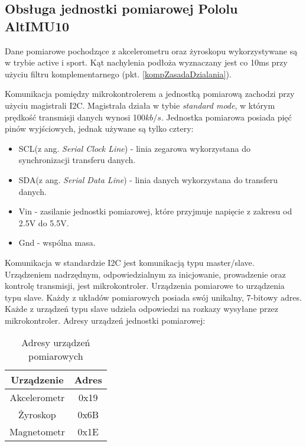 \subsection{Obsługa jednostki pomiarowej Pololu AltIMU10}
Dane pomiarowe pochodzące z akcelerometru oraz żyroskopu wykorzystywane są w trybie active i sport. Kąt nachylenia podłoża wyznaczany jest co 10ms przy użyciu filtru komplementarnego (pkt. \ref{kompZasadaDzialania}). 
 
Komunikacja pomiędzy mikrokontrolerem a jednostką pomiarową zachodzi przy użyciu magistrali I2C. Magistrala działa w tybie \textit{standard mode}, w którym prędkość transmisji danych wynosi 100$kb/s$. Jednostka pomiarowa posiada pięć pinów wyjściowych, jednak używane są tylko cztery:
\begin{itemize}
    \item
    SCL(z ang. {\em Serial Clock Line}) - linia zegarowa wykorzystana do synchronizacji transferu danych.
    \item
    SDA(z ang. {\em Serial Data Line}) - linia danych wykorzystana do transferu danych.
    \item
    Vin - zasilanie jednostki pomiarowej, które przyjmuje napięcie z zakresu od 2.5V do 5.5V.
    \item
    Gnd - wspólna masa.
\end{itemize} 

Komunikacja w standardzie I2C jest komunikacją typu master/slave. Urządzeniem nadrzędnym, odpowiedzialnym za inicjowanie, prowadzenie oraz kontrolę transmisji, jest mikrokontroler. Urządzenia pomiarowe to urządzenia typu slave. Każdy z układów pomiarowych posiada swój unikalny, 7-bitowy adres. Każde z urządzeń typu slave udziela odpowiedzi na rozkazy wysyłane przez mikrokontroler. Adresy urządzeń jednostki pomiarowej:

\begin{table}[h]
    \caption{Adresy urządzeń pomiarowych}
    \begin{center}
		\label{tab:adresyImu}
		\begin{tabular}{|c|c|}
			\hline
 			\textbf{Urządzenie} & \textbf{Adres} \\
 			\hline
 			Akcelerometr & 0x19 \\  
 			\hline
			Żyroskop & 0x6B \\
			\hline
			Magnetometr & 0x1E \\  
			\hline
		\end{tabular}
	\end{center}
\end{table}

